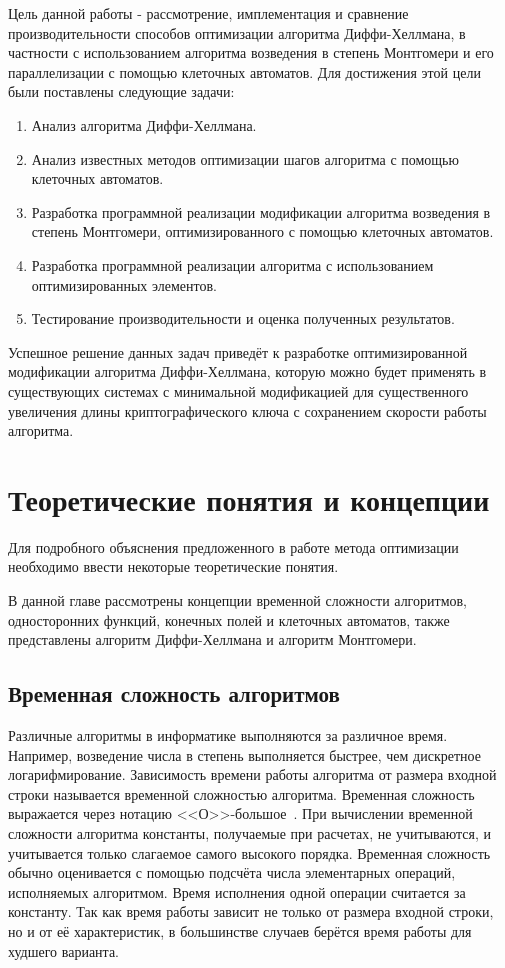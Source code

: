\documentclass[times,specification,annotation]{itmo-student-thesis}
\begin{document}
Цель данной работы - рассмотрение, имплементация и сравнение производительности способов оптимизации алгоритма
Диффи-Хеллмана, в частности с использованием алгоритма возведения в степень Монтгомери и его параллелизации
с помощью клеточных автоматов.
Для достижения этой цели были поставлены следующие задачи:
\begin{enumerate}[label=\arabic*.]
    \item Анализ алгоритма Диффи-Хеллмана.
    \item Анализ известных методов оптимизации шагов алгоритма с помощью клеточных автоматов.
    \item Разработка программной реализации модификации алгоритма возведения в степень Монтгомери, оптимизированного
        с помощью клеточных автоматов.
    \item Разработка программной реализации алгоритма с использованием оптимизированных элементов.
    \item Тестирование производительности и оценка полученных результатов.
\end{enumerate}
Успешное решение данных задач приведёт к разработке оптимизированной модификации алгоритма Диффи-Хеллмана,
которую можно будет применять в существующих системах с минимальной модификацией для существенного увеличения длины
криптографического ключа с сохранением скорости работы алгоритма.


\chapter{Теоретические понятия и концепции}

\startrelatedwork
Для подробного объяснения предложенного в работе метода оптимизации необходимо ввести некоторые теоретические понятия.

В данной главе рассмотрены концепции временной сложности алгоритмов, односторонних функций, конечных полей и клеточных автоматов,
также представлены алгоритм Диффи-Хеллмана и алгоритм Монтгомери.

\section{Временная сложность алгоритмов}\label{sec:asympt}

Различные алгоритмы в информатике выполняются за различное время.
Например, возведение числа в степень выполняется быстрее, чем дискретное логарифмирование.
Зависимость времени работы алгоритма от размера входной строки называется временной сложностью алгоритма.
Временная сложность выражается через нотацию <<$\textit{О}$>>-большое~\cite{knu97}.
При вычислении временной сложности алгоритма константы, получаемые при расчетах, не учитываются, и учитывается только слагаемое самого высокого порядка.
Временная сложность обычно оценивается с помощью подсчёта числа элементарных операций, исполняемых алгоритмом.
Время исполнения одной операции считается за константу.
Так как время работы зависит не только от размера входной строки, но и от её характеристик,
в большинстве случаев берётся время работы для худшего варианта.
\end{document}
